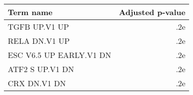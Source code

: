 \begin{tabular}{lr}
\toprule
              Term name &  Adjusted p-value \\
\midrule
          TGFB UP.V1 UP &               .2e \\
          RELA DN.V1 UP &               .2e \\
ESC V6.5 UP EARLY.V1 DN &               .2e \\
        ATF2 S UP.V1 DN &               .2e \\
           CRX DN.V1 DN &               .2e \\
\bottomrule
\end{tabular}
